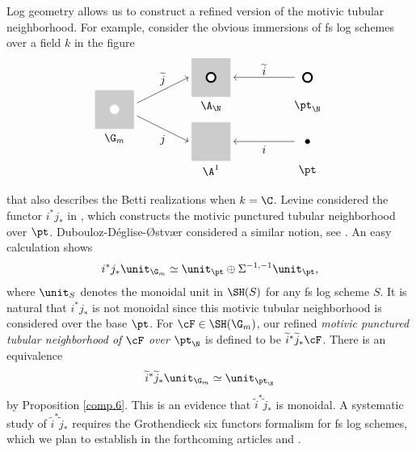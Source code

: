\documentclass[10pt]{amsart}
\begin{document}
Log geometry allows us to construct a refined version of the motivic tubular neighborhood. 
For example, consider the obvious immersions of fs log schemes over a field $k$ in the figure
\[
\begin{tikzpicture}
\filldraw[black!20] (0.6,0.6)--(0.6,-0.6)--(-0.6,-0.6)--(-0.6,0.6);
\filldraw[white] (0,0) circle (4pt);
\node at (0,-0.9) {$\G_m$};
\begin{scope}[shift={(3,1)}]
\filldraw[black!20]
(0.6,0.6)--(0.6,-0.6)--(-0.6,-0.6)--(-0.6,0.6);
\filldraw[ultra thick,fill=white] (0,0) circle (4pt);
\node at (0,-0.9) {$\A_\N$};
\end{scope}
\begin{scope}[shift={(3,-1)}]
\filldraw[black!20]
(0.6,0.6)--(0.6,-0.6)--(-0.6,-0.6)--(-0.6,0.6);
\node at (0,-0.9) {$\A^1$};
\end{scope}
\begin{scope}[shift={(6,1)}]
\draw[ultra thick] (0,0) circle (4pt);
\node at (0,-0.9) {$\pt_{\N}$};
\end{scope}
\begin{scope}[shift={(6,-1)}]
\filldraw (0,0) circle (2pt);
\node at (0,-0.9) {$\pt$};
\end{scope}
\draw[<-] (2.3,1)--(0.7,0.2);
\draw[<-] (2.3,-1)--(0.7,-0.2);
\draw[->] (5.6,1)--(3.7,1);
\draw[->] (5.6,-1)--(3.7,-1);
\node at (1.5,0.95) {$\widetilde{j}$};
\node at (1.5,-0.95) {$j$};
\node at (4.65,1.25) {$\widetilde{i}$};
\node at (4.65,-1.25) {$i$};
\end{tikzpicture}
\]
that also describes the Betti realizations when $k=\C$.
Levine considered the functor $i^*j_*$ in \cite{MR2302525}, which constructs the motivic punctured tubular neighborhood over $\pt$.
Dubouloz-D\'eglise-{\O}stv{\ae}r considered a similar notion, see \cite{2206.01564}.
An easy calculation shows
\[
i^*j_*\unit_{\G_m}\simeq \unit_{\pt} \oplus \Sigma^{-1,-1}\unit_{\pt},
\]
where $\unit_S$ denotes the monoidal unit in $\SH(S)$ for any fs log scheme $S$.
It is natural that $i^*j_*$ is not monoidal since this motivic tubular neighborhood is considered over the base $\pt$.
For $\cF\in \SH(\G_m)$, our refined \emph{motivic punctured tubular neighborhood of $\cF$ over $\pt_{\N}$} is defined to be $\widetilde{i}^*\widetilde{j}_*\cF$.
There is an equivalence
\[
\widetilde{i}^*\widetilde{j}_*\unit_{\G_m}\simeq \unit_{\pt_{\N}}
\]
by Proposition \ref{comp.6}.
This is an evidence that $\widetilde{i}^*\widetilde{j}_*$ is monoidal.
A systematic study of $\widetilde{i}^*\widetilde{j}_*$ requires the Grothendieck six functors formalism for fs log schemes, which we plan to establish in the forthcoming articles \cite{logGysin} and \cite{logsix}.
\end{document}
